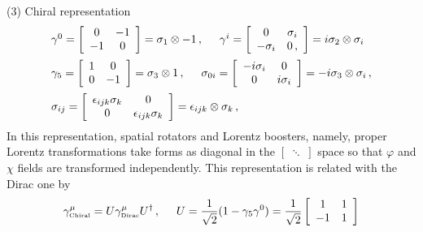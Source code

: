 \noindent
(3) Chiral representation\\
\begin{eqnarray}
\begin{array}{l}
\gamma^0
=
\left[
\begin{array}{cc}
0 & -1 \\ -1 & 0
\end{array}
\right]
= \sigma_1 \otimes -1
\,,
\hspace{5mm}
\gamma^i
=
\left[
\begin{array}{cc}
0  & \sigma_i \\  -\sigma_i & 0\,,
\end{array}
\right]
=
i\sigma_2 \otimes \sigma_i
\vspace{2mm}
\\ %
\gamma_5
=
\left[
\begin{array}{cc}
1 & 0 \\ 0 & -1
\end{array}
\right]
= \sigma_3 \otimes 1
\,,
\hspace{5mm}
\sigma_{0i}
=
\left[
\begin{array}{cc}
-i\sigma_i & 0 \\  0 & i\sigma_i
\end{array}
\right]
=
-i\sigma_3 \otimes \sigma_i\,,
\vspace{2mm}
\\ %
\sigma_{ij}
=
\left[
\begin{array}{cc}
\epsilon_{ijk}\sigma_k & 0 \\  0 & \epsilon_{ijk}\sigma_k
\end{array}
\right]
=
\epsilon_{ijk} \otimes \sigma_k\,,
\end{array}
\end{eqnarray}
In this representation, spatial rotators and Lorentz boosters, namely, proper Lorentz transformations
take forms as diagonal in the $\left[\;\ddots\;\right]$ space so that $\varphi$ and $\chi$ fields
are transformed independently. This representation is related with the Dirac one by
\begin{eqnarray}
\gamma^\mu_{\mbox{\tiny Chiral}}
= U \gamma^\mu_{\mbox{\tiny Dirac}} U^{\dagger}\,,
\hspace{5mm}
U = 
\frac{1}{\sqrt{2}}
(1 - \gamma_5 \gamma^0)
=
\frac{1}{\sqrt{2}}
\left[
\begin{array}{cc}
1 & 1 \\
-1 & 1
\end{array}
\right]
\end{eqnarray}\\




